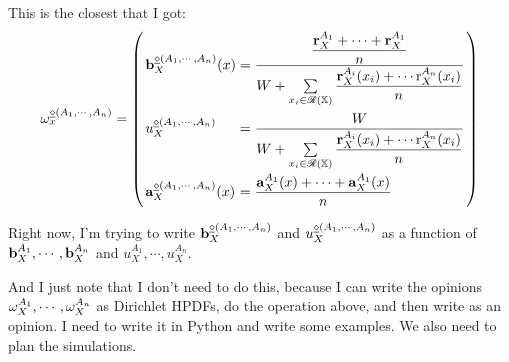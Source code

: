 \documentclass[a4paper,12pt]{article}
\theoremstyle{definition}
\theoremstyle{theorem}
\numberwithin{equation}{section}
\begin{document}
This is the closest that I got:
\begin{equation}
\arraycolsep=1.4pt\def\arraystretch{2.2}
\opia{\abfs(A_1, \cdots, A_n)}{x} =
\left(
\begin{array}{ll}
\bmdax{\abfs(A_1, \cdots, A_n)}{X}{x} & = \dfrac{\dfrac{\mathbf{r}^{A_1}_X + \cdots + \mathbf{r}^{A_1}_X}{n}}{W + \sum\limits_{x_i \in \hdom{X}} \dfrac{\mathbf{r}^{A_i}_X(x_i) + \cdots \mathrm{r}^{A_n}_X(x_i)}{n}} \\
u^{\abfs(A_1, \cdots, A_n)}_X & = \dfrac{W}{W + \sum\limits_{x_i \in \hdom{X}} \dfrac{\mathbf{r}^{A_i}_X(x_i) + \cdots \mathrm{r}^{A_n}_X(x_i)}{n}} \\
\adax{\abfs(A_1, \cdots, A_n)}{X}{x} & = \dfrac{\adax{A_1}{X}{x} + \cdots + \adax{A_1}{X}{x}}{n}
\end{array}
\right)
\end{equation}

Right now, I'm trying to write $\mathbf{b}^{\underline{\diamond}(A_1, \cdots, A_n)}_{X}$ and 
$u^{\underline{\diamond}(A_1, \cdots, A_n)}_X$ as a function of $\mathbf{b}^{A_1}_{X}, \cdots, \mathbf{b}^{A_n}_{X}$ and $u^{A_1}_X, \cdots, u^{A_n}_X$.

And I just note that I don't need to do this, because I can write the opinions $\omega^{A_1}_{X}, \cdots, \omega^{A_n}_{X}$ as Dirichlet HPDFs, do the operation above, and then write as an opinion. I need to write it in Python and write some examples. We also need to plan the simulations.


\printbibliography
\end{document}
